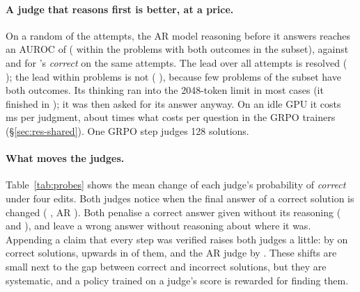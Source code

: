 \paragraph{A judge that reasons first is better, at a price.} On a random  of the attempts, the AR model
reasoning before it answers reaches an AUROC of  ( within the  problems with
both outcomes in the subset), against  and  for \kev{}'s \emph{correct} on
the same attempts. The lead over all attempts is resolved ( );
the lead within problems is not ( ), because few
problems of the subset have both outcomes. Its thinking ran into the 2048-token limit in most cases (it finished in ); it was
then asked for its answer anyway. On an idle GPU it costs \,ms per judgment, about 
times what \kev{} costs per question in the GRPO trainers (\S\ref{sec:res-shared}). One GRPO step judges 128 solutions.

\paragraph{What moves the judges.} Table~\ref{tab:probes} shows the mean change of each judge's probability of
\emph{correct} under four edits. Both judges notice when the final answer of a correct solution is changed (\kev{}
, AR ). Both penalise a correct answer given without its reasoning
( and ), and leave a wrong answer without reasoning about where
it was. Appending a claim that every step was verified raises both judges a little: \kev{} by
 on correct solutions, upwards in  of them, and the AR judge by
. These shifts are small next to the gap between correct and incorrect solutions, but they are
systematic, and a policy trained on a judge's score is rewarded for finding them.

\begin{table}[t]
\centering\small

\caption{Mean change of $\pc$ (\kev{}) and $P_{\mathrm{a}}$ (AR judge) when a completion is edited, separately for
completions the verifier marks correct and incorrect. \emph{Answer only}: the completion replaced by one sentence giving
its final answer; \emph{padded}: twenty self-doubt sentences appended; \emph{asserted}: a claim of verification
appended; \emph{altered}: the final answer of a correct completion changed.}
\label{tab:probes}
\end{table}
